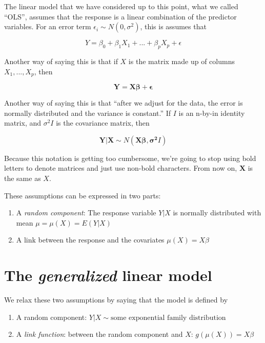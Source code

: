 \documentclass[openany]{book}
\begin{document}
The linear model that we have considered up to this point, what we called ``OLS'', assumes that the response is a linear combination of the predictor variables. For an error term \(\epsilon_i \sim N(0,\sigma^2)\), this is assumes that

\[
Y = \beta_0 + \beta_1 X_1 + ... + \beta_p X_p + \epsilon
\]

Another way of saying this is that if \(X\) is the matrix made up of columns \(X_1, ..., X_p\), then

\[
\mathbf{Y} = \mathbf{X} \mathbf{\beta} + \mathbf{\epsilon}
\]

Another way of saying this is that ``after we adjust for the data, the error is normally distributed and the variance is constant.'' If \(I\) is an n-by-in identity matrix, and \(\sigma^2 I\) is the covariance matrix, then

\[
\mathbf{Y|X} \sim N( \mathbf{X \beta}, \mathbf{\sigma^2} I)
\]

Because this notation is getting too cumbersome, we're going to stop using bold letters to denote matrices and just use non-bold characters. From now on, \(\mathbf{X}\) is the same as \(X\).

These assumptions can be expressed in two parts:

\begin{enumerate}
\def\labelenumi{\arabic{enumi}.}
\item
  A \emph{random component}: The response variable \(Y|X\) is normally distributed with mean \(\mu = \mu(X) = E(Y|X)\)
\item
  A link between the response and the covariates \(\mu(X) = X\beta\)
\end{enumerate}

\hypertarget{the-generalized-linear-model}{%
\section{\texorpdfstring{The \emph{generalized} linear model}{The generalized linear model}}\label{the-generalized-linear-model}}

We relax these two assumptions by saying that the model is defined by

\begin{enumerate}
\def\labelenumi{\arabic{enumi}.}
\item
  A random component: \(Y|X \sim \text{some exponential family distribution}\)
\item
  A \emph{link function}: between the random component and \(X\): \(g(\mu(X)) = X\beta\)
\end{enumerate}
\end{document}
